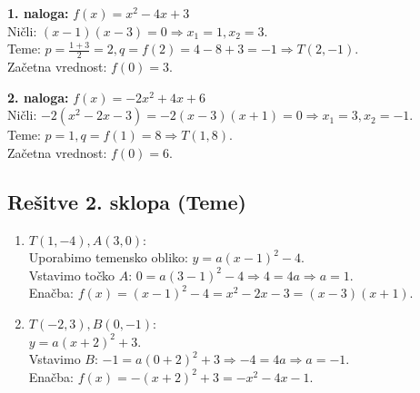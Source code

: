 \documentclass[a4paper,12pt]{article}
\begin{document}
\textbf{1. naloga:} $f(x) = x^2 - 4x + 3$ \\
Ničli: $(x-1)(x-3)=0 \Rightarrow x_1=1, x_2=3$. \\
Teme: $p = \frac{1+3}{2} = 2, q = f(2) = 4-8+3 = -1 \Rightarrow T(2, -1)$. \\
Začetna vrednost: $f(0) = 3$.


\textbf{2. naloga:} $f(x) = -2x^2 + 4x + 6$ \\
Ničli: $-2(x^2 - 2x - 3) = -2(x-3)(x+1) = 0 \Rightarrow x_1=3, x_2=-1$. \\
Teme: $p = 1, q = f(1) = 8 \Rightarrow T(1, 8)$. \\
Začetna vrednost: $f(0) = 6$.


\subsection*{Rešitve 2. sklopa (Teme)}

\begin{enumerate}
    \item $T(1, -4), A(3, 0)$: \\
    Uporabimo temensko obliko: $y = a(x-1)^2 - 4$. \\
    Vstavimo točko $A$: $0 = a(3-1)^2 - 4 \Rightarrow 4 = 4a \Rightarrow a=1$. \\
    Enačba: $f(x) = (x-1)^2 - 4 = x^2 - 2x - 3 = (x-3)(x+1)$.

    \item $T(-2, 3), B(0, -1)$: \\
    $y = a(x+2)^2 + 3$. \\
    Vstavimo $B$: $-1 = a(0+2)^2 + 3 \Rightarrow -4 = 4a \Rightarrow a=-1$. \\
    Enačba: $f(x) = -(x+2)^2 + 3 = -x^2 - 4x - 1$.
\end{enumerate}
\end{document}
